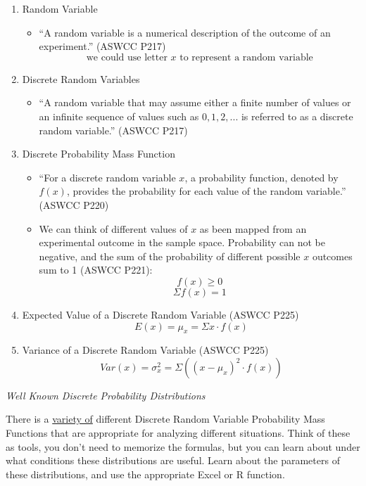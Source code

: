 \documentclass[
]{book}
\providecommand{\tightlist}{%
  \setlength{\itemsep}{0pt}\setlength{\parskip}{0pt}}
\begin{document}
\begin{enumerate}
\def\labelenumi{\arabic{enumi}.}
\tightlist
\item
  Random Variable

  \begin{itemize}
  \tightlist
  \item
    ``A random variable is a numerical description of the outcome of an experiment.'' (ASWCC P217)
    \[ \text{we could use letter } x \text{ to represent a random variable}\]
  \end{itemize}
\item
  Discrete Random Variables

  \begin{itemize}
  \tightlist
  \item
    ``A random variable that may assume either a finite number of values or an infinite sequence of values such as \(0,1,2,...\) is referred to as a discrete random variable.'' (ASWCC P217)
  \end{itemize}
\item
  Discrete Probability Mass Function

  \begin{itemize}
  \tightlist
  \item
    ``For a discrete random variable \(x\), a probability function, denoted by \(f(x)\), provides the probability for each value of the random variable.'' (ASWCC P220)
  \item
    We can think of different values of \(x\) as been mapped from an experimental outcome in the sample space. Probability can not be negative, and the sum of the probability of different possible \(x\) outcomes sum to 1 (ASWCC P221):
    \[ f(x) \ge 0\]
    \[\Sigma f(x) = 1\]
  \end{itemize}
\item
  Expected Value of a Discrete Random Variable (ASWCC P225)
  \[E(x) = \mu_x = \Sigma x \cdot f(x)\]
\item
  Variance of a Discrete Random Variable (ASWCC P225)
  \[Var(x) = \sigma_x^2 = \Sigma \left( (x - \mu_x)^2 \cdot f(x) \right)\]
\end{enumerate}

\emph{Well Known Discrete Probability Distributions}

There is a \href{https://en.wikipedia.org/wiki/List_of_probability_distributions\#Discrete_distributions}{variety of} different Discrete Random Variable Probability Mass Functions that are appropriate for analyzing different situations. Think of these as tools, you don't need to memorize the formulas, but you can learn about under what conditions these distributions are useful. Learn about the parameters of these distributions, and use the appropriate Excel or R function.
\end{document}
